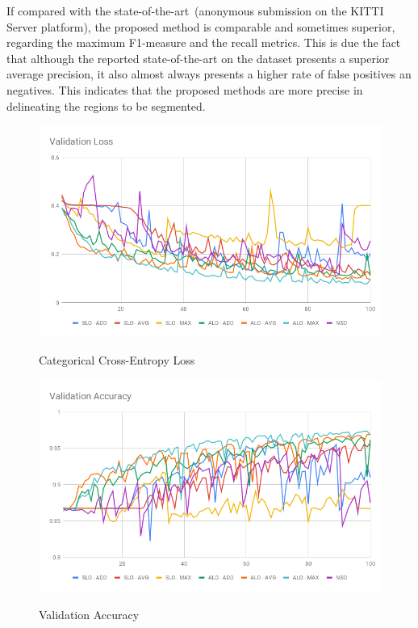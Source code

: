 If compared with the state-of-the-art~(anonymous submission on the KITTI Server platform), the proposed method is comparable and sometimes superior, regarding the maximum F1-measure and the recall metrics. This is due the fact that although the reported state-of-the-art on the dataset presents a superior average precision, it also almost always presents a higher rate of false positives an negatives. This indicates that the proposed methods are more precise in delineating the regions to be segmented.       





\begin{figure}
  \caption{Categorical Cross-Entropy Loss}
  \centering
  \includegraphics[width=1.\columnwidth]{figures/falreis/validation_loss.png}\label{fig:validation_loss}
\end{figure}

\begin{figure}
  \caption{Validation Accuracy}
  \centering
  \includegraphics[width=1.\columnwidth]{figures/falreis/validation_accuracy.png}\label{fig:validation_accuracy}
\end{figure}

